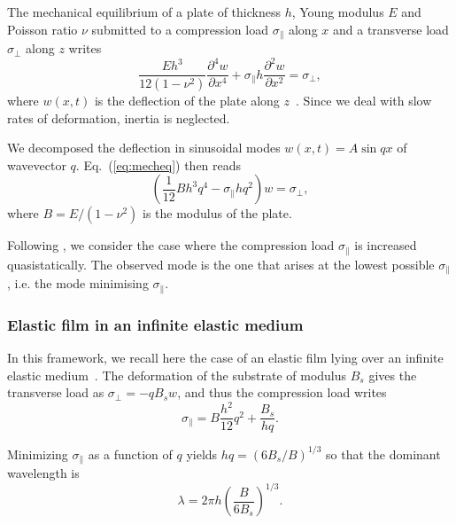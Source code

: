 \documentclass[twocolumn,superscriptaddress,showpacs,preprintnumbers,
amsmath,amssymb,prl]{revtex4-1}
\begin{document}
The mechanical equilibrium of a plate of thickness $h$, Young modulus $E$ and Poisson ratio $\nu$ submitted to a compression load $\sigma_\parallel$ along $x$ and a transverse load $\sigma_\perp$ along $z$ writes
\begin{equation}
\frac{E h^3}{12(1-\nu^2)}\frac{\partial^4 w}{\partial x^4} + \sigma_\parallel h \frac{\partial^2 w}{\partial x^2} = \sigma_\perp,
\label{eq:mecheq}
\end{equation}
where $w(x,t)$ is the deflection of the plate along $z$~\cite{Biot1957}. Since we deal with slow rates of deformation, inertia is neglected.

We decomposed the deflection in sinusoidal modes $w(x,t) =  A \sin qx$ of wavevector $q$. Eq.~(\ref{eq:mecheq}) then reads
\begin{equation}
\left(\frac{1}{12} B h^3 q^4 - \sigma_\parallel h q^2\right)w = \sigma_\perp,
\label{eq:mecheqop}
\end{equation}
where $B=E/(1-\nu^2)$ is the modulus of the plate.

Following \cite{Biot1957}, we consider the case where the compression load $\sigma_\parallel$ is increased quasistatically. The observed mode is the one that arises at the lowest possible $\sigma_\parallel$, i.e. the mode minimising $\sigma_\parallel$.

\subsubsection*{Elastic film in an infinite elastic medium}

In this framework, we recall here the case of an elastic film lying over an infinite elastic medium~\cite{Gough1940,Bijlaard1946,Biot1957,Cerda2003}. The deformation of the substrate of modulus $B_s$ gives the transverse load as $\sigma_\perp = -q B_s w$, and thus the compression load writes
\begin{equation}
\sigma_\parallel = B \frac{h^2}{12} q^2 + \frac{B_s}{hq}.
\label{eq:sigma0}
\end{equation}

Minimizing $\sigma_\parallel$ as a function of $q$ yields $hq = \left(6B_s/B\right)^{1/3}$ \cite{Biot1957,Cerda2003} so that the dominant wavelength is 
\begin{equation}
\lambda = 2\pi h \left(\frac{B}{6B_s}\right)^{1/3}.
\label{eq:lambdaElEl}
\end{equation}
\end{document}
